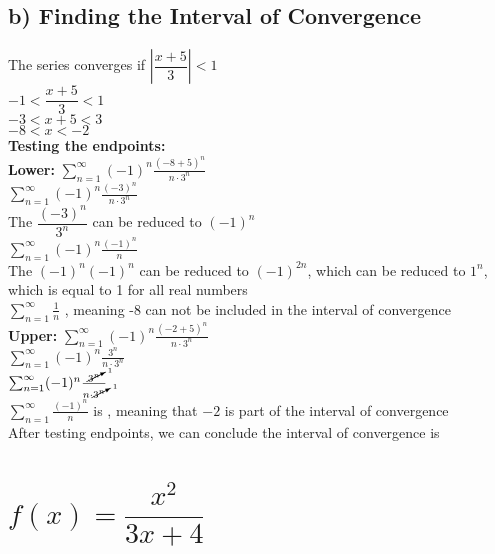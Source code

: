 \documentclass{article}
\begin{document}
\begin{multicols*}{2}
\subsection*{b) Finding the Interval of Convergence}
The series converges if $ \left|\dfrac{x+5}{3}\right|<1$
\\[0.1in]$-1< \dfrac{x+5}{3}<1$
\\[0.1in]$-3<{x+5}<3$
\\[0.1in]$-8<x<-2$
\\\textbf{Testing the endpoints:}
\\\textbf{Lower:} $ \sum_{n=1}^{\infty}  (-1)^n \frac{(-8+5)^n}{n\cdot 3^n}$
\\[0.1in]$ \sum_{n=1}^{\infty}  (-1)^n \frac{(-3)^n}{n\cdot 3^n}$
\\[0.1in]The $\dfrac{(-3)^n}{3^n}$ can be reduced to $(-1)^n$
\\[0.1in]$ \sum_{n=1}^{\infty}  (-1)^n \frac{(-1)^n}{n}$
\\[0.1in]The ${(-1)^n}{(-1)^n}$ can be reduced to $(-1)^{2n}$, which can be reduced to $1^n$, which is equal to 1 for all real numbers
\\[0.1in]$ \sum_{n=1}^{\infty}\frac{1}{n}$ , meaning -8 can not be included in the interval of convergence
\\[0.1in]\textbf{Upper:} $ \sum_{n=1}^{\infty}  (-1)^n \frac{(-2+5)^n}{n\cdot 3^n}$
\\[0.1in]$ \sum_{n=1}^{\infty}  (-1)^n \frac{3^n}{n\cdot 3^n}$
\\[0.1in]$ \sum_{n=1}^{\infty}  (-1)^n \frac{\cancelto{1}{3^n}}{n\cdot \cancelto{1}{3^n}}$
\\[0.1in]$ \sum_{n=1}^{\infty} \frac{(-1)^n}{n}$ is , meaning that $-2$ is part of the interval of convergence
\\[0.1in]After testing endpoints, we can conclude the interval of convergence is  

\end{multicols*}

\section{$ f(x)=\dfrac{x^2}{3x+4}$}
\end{document}
